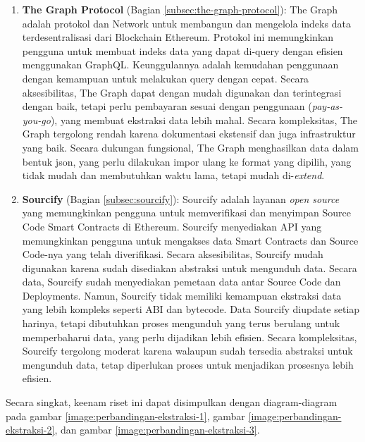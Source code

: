 \begin{enumerate}
	\item \textbf{The Graph Protocol} \parencite{TheGraphDocs} (Bagian \ref{subsec:the-graph-protocol}): The Graph adalah protokol dan Network untuk membangun dan mengelola indeks data terdesentralisasi dari Blockchain Ethereum. Protokol ini memungkinkan pengguna untuk membuat indeks data yang dapat di-query dengan efisien menggunakan GraphQL. Keunggulannya adalah kemudahan penggunaan dengan kemampuan untuk melakukan query dengan cepat. Secara aksesibilitas, The Graph dapat dengan mudah digunakan dan terintegrasi dengan baik, tetapi perlu pembayaran sesuai dengan penggunaan (\textit{pay-as-you-go}), yang membuat ekstraksi data lebih mahal. Secara kompleksitas, The Graph tergolong rendah karena dokumentasi ekstensif dan juga infrastruktur yang baik. Secara dukungan fungsional, The Graph menghasilkan data dalam bentuk json, yang perlu dilakukan impor ulang ke format yang dipilih, yang tidak mudah dan membutuhkan waktu lama, tetapi mudah di-\textit{extend}.

	\item \textbf{Sourcify} \parencite{sourcify_website} (Bagian \ref{subsec:sourcify}): Sourcify adalah layanan \textit{open source} yang memungkinkan pengguna untuk memverifikasi dan menyimpan Source Code Smart Contracts di Ethereum. Sourcify menyediakan API yang memungkinkan pengguna untuk mengakses data Smart Contracts dan Source Code-nya yang telah diverifikasi. Secara aksesibilitas, Sourcify mudah digunakan karena sudah disediakan abstraksi untuk mengunduh data. Secara data, Sourcify sudah menyediakan pemetaan data antar Source Code dan Deployments. Namun, Sourcify tidak memiliki kemampuan ekstraksi data yang lebih kompleks seperti ABI dan bytecode. Data Sourcify diupdate setiap harinya, tetapi dibutuhkan proses mengunduh yang terus berulang untuk memperbaharui data, yang perlu dijadikan lebih efisien. Secara kompleksitas, Sourcify tergolong moderat karena walaupun sudah tersedia abstraksi untuk mengunduh data, tetap diperlukan proses untuk menjadikan prosesnya lebih efisien.
\end{enumerate}

Secara singkat, keenam riset ini dapat disimpulkan dengan diagram-diagram pada gambar \ref{image:perbandingan-ekstraksi-1}, gambar \ref{image:perbandingan-ekstraksi-2}, dan gambar \ref{image:perbandingan-ekstraksi-3}.

\newpage


